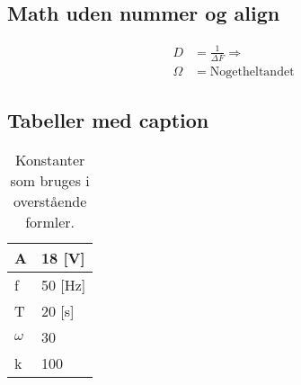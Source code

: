 \subsection*{Math uden nummer og align}
\begin{align}
D &= \frac{1}{\Delta F} \Rightarrow \nonumber \\
\Omega &= \mathrm{Noget helt andet}
\end{align}
\subsection*{Tabeller med caption}
\begin{table}
\centering
    \caption{Konstanter som bruges i overstående formler.}
\label{tab:konst1}
    \begin{tabular}{ | l | l |}
    \hline
    A & 18 [V] \\ \hline
    f & 50 [Hz]  \\ \hline
    T & 20 [s]  \\ \hline
    $\omega$ & 30 \\ \hline
    k & 100 \\ \hline
    \end{tabular}
    \end{table}

\newpage